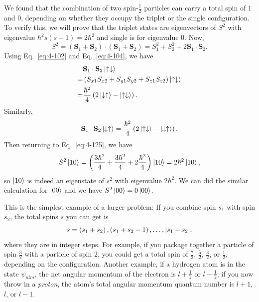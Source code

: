 We found that the combination of two spin-$\frac{1}{2}$ particles can carry a total spin of $1$ and $0$, depending on whether they occupy the triplet or the single configuration.
To verify this, we will prove that the triplet states are eigenvectors of $S^2$ with eigenvalue $\hbar^{2} s \left( s+1 \right) = 2\hbar^{2}$ and single is for eigenvalue $0$.
Now,
\begin{equation}
  \label{eq:4-127}
 S^2 = \left( \mathbf{S}_1 + \mathbf{S}_2 \right) \cdot \left( \mathbf{S}_1 + \mathbf{S}_2 \right) = S_1^2 + S_2^2 + 2 \mathbf{S}_1 \cdot \mathbf{S}_2.
\end{equation}
Using Eq.~\eqref{eq:4-102} and Eq.~\eqref{eq:4-104}, we have
\begin{align*}
  & \mathbf{S}_1 \cdot \mathbf{S}_2 \ket{\uparrow \downarrow} \\
  =& \left( S_{x1}S_{x2} + S_{y1}S_{y2} + S_{z1}S_{z2} \right) \ket{\uparrow\downarrow}\\
  =& \frac{\hbar^{2}}{4} \left( 2\ket{\downarrow\uparrow} - \ket{\uparrow\downarrow} \right).
\end{align*}
Similarly,
\begin{equation*}
   \mathbf{S}_1 \cdot \mathbf{S}_2 \ket{\downarrow \uparrow}  =  \frac{\hbar^{2}}{4} \left( 2 \ket{\uparrow \downarrow} - \ket{\downarrow\uparrow} \right).
\end{equation*}
Then returning to Eq.~\eqref{eq:4-125}, we have
\begin{equation}
  \label{eq:4-128}
  S^2 \ket{10} = \left( \frac{3\hbar^{2}}{4} + \frac{3\hbar^{2}}{4} + 2 \frac{\hbar^{2}}{4} \right) \ket{10} = 2\hbar^2 \ket{10},
\end{equation}
so $\ket{10}$ is indeed an eigenstate of $s^2$ with eigenvalue $2\hbar^{2}$.
We can did the similar calculation for $\ket{00}$ and we have $S^2 \ket{00}= 0 \ket{00}$.

This is the simplest example of a larger problem: If you combine spin $s_1$ with spin $s_2$, the total spins $s$ you can get is
\begin{equation}
  \label{eq:4-129}
 s = \left( s_1 + s_2 \right), \left( s_1+s_2-1 \right), \ldots, \abs{s_1-s_2},
\end{equation}
where they are in integer steps.
For example, if you package together a particle of spin $\frac{3}{2}$ with a particle of spin $2$, you could get a total spin of $\frac{7}{2}$, $\frac{5}{2}$, $\frac{3}{2}$, or $\frac{1}{2}$, depending on the configuration.
Another example, if a hydrogen atom is in the state $\psi_{nlm}$, the net angular momentum of the electron is $l+ \frac{1}{2}$ or $l - \frac{1}{2}$;
if you now throw in a \textit{proton}, the atom's total angular momentum quantum number is $l+1$, $l$, or $l-1$.

